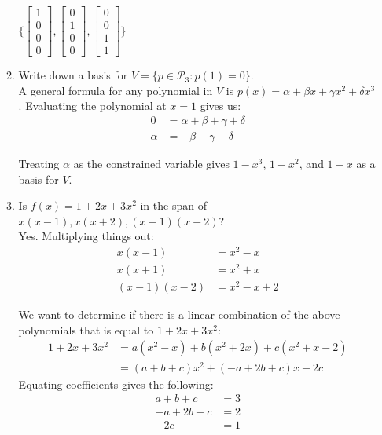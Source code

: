 \documentclass[11pt]{amsart}
\theoremstyle{plain}
\theoremstyle{definition}
\begin{document}
\begin{enumerate}
\begin{enumerate}
\begin{center}
$\Bigg\{\begin{bmatrix} 1 \\ 0 \\ 0 \\ 0 \end{bmatrix}, \begin{bmatrix} 0 \\ 1 \\ 0 \\ 0 \end{bmatrix}, \begin{bmatrix} 0 \\ 0 \\ 1 \\ 1 \end{bmatrix}\Bigg\}$
\end{center}

\bigskip
\item Write down a basis for $V = \{p \in \mathcal{P}_3: p(1) = 0\}$. \\

A general formula for any polynomial in $V$ is $p(x) = \alpha + \beta x + \gamma x^2 + \delta x^3$. Evaluating the polynomial at $x = 1$ gives us:
\begin{align} \nonumber
0 &= \alpha + \beta + \gamma + \delta \\ \nonumber
\alpha &= -\beta - \gamma - \delta
\end{align}

Treating $\alpha$ as the constrained variable gives $1 - x^3$, $1 - x^2$, and $1 - x$ as a basis for $V$.

\bigskip
\item Is $f(x) = 1 + 2x + 3x^2$ in the span of $x(x-1), x(x+2), (x-1)(x+2)$? \\
Yes. Multiplying things out: 
\begin{align} \nonumber
x(x-1) &= x^2 - x \\ \nonumber
x(x+1) &= x^2 + x \\ \nonumber
(x-1)(x-2) &= x^2 - x + 2
\end{align}

We want to determine if there is a linear combination of the above polynomials that is equal to $1 + 2x + 3x^2$:
\begin{align} \nonumber
1 + 2x + 3x^2 &= a(x^2 - x) + b(x^2 + 2x) + c(x^2 + x -2) \\ \nonumber
                    &= (a + b + c)x^2 + (-a + 2b + c)x - 2c
\end{align} 
Equating coefficients gives the following:
\begin{align} \nonumber
a + b + c &= 3 \\ \nonumber
-a + 2b + c &= 2 \\ \nonumber
-2c &= 1
\end{align}


\end{enumerate}
\end{enumerate}
\end{document}

